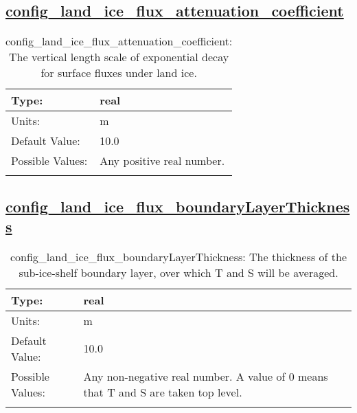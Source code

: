 \subsection[config\_land\_ice\_flux\_attenuation\_coefficient]{\hyperref[sec:nm_tab_land_ice_fluxes]{config\_land\_ice\_flux\_attenuation\_coefficient}}
\label{subsec:nm_sec_config_land_ice_flux_attenuation_coefficient}
\begin{center}
\begin{longtable}{| p{2.0in} || p{4.0in} |}
    \hline
    Type: & real \\
    \hline
    Units: & \si{m} \\
    \hline
    Default Value: & 10.0 \\
    \hline
    Possible Values: & Any positive real number. \\
    \hline
    \caption{config\_land\_ice\_flux\_attenuation\_coefficient: The vertical length scale of exponential decay for surface fluxes under land ice.}
\end{longtable}
\end{center}
\subsection[config\_land\_ice\_flux\_boundaryLayerThickness]{\hyperref[sec:nm_tab_land_ice_fluxes]{config\_land\_ice\_flux\_boundaryLayerThickness}}
\label{subsec:nm_sec_config_land_ice_flux_boundaryLayerThickness}
\begin{center}
\begin{longtable}{| p{2.0in} || p{4.0in} |}
    \hline
    Type: & real \\
    \hline
    Units: & \si{m} \\
    \hline
    Default Value: & 10.0 \\
    \hline
    Possible Values: & Any non-negative real number.  A value of 0 means that T and S are taken top level. \\
    \hline
    \caption{config\_land\_ice\_flux\_boundaryLayerThickness: The thickness of the sub-ice-shelf boundary layer, over which T and S will be averaged.}
\end{longtable}
\end{center}

